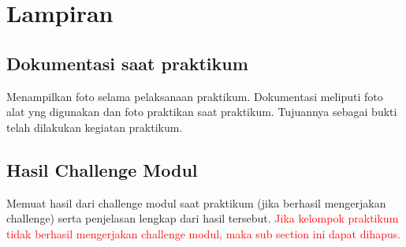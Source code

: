 \section{Lampiran}
\subsection{Dokumentasi saat praktikum}
Menampilkan foto selama pelaksanaan praktikum. Dokumentasi meliputi foto alat yng digunakan dan foto praktikan saat praktikum. Tujuannya sebagai bukti telah dilakukan kegiatan praktikum.

\subsection{Hasil Challenge Modul}
Memuat hasil dari challenge modul saat praktikum (jika berhasil mengerjakan challenge) serta penjelasan lengkap dari hasil tersebut. 
\textcolor{red}{Jika kelompok praktikum tidak berhasil mengerjakan challenge modul, maka sub section ini dapat dihapus.}
